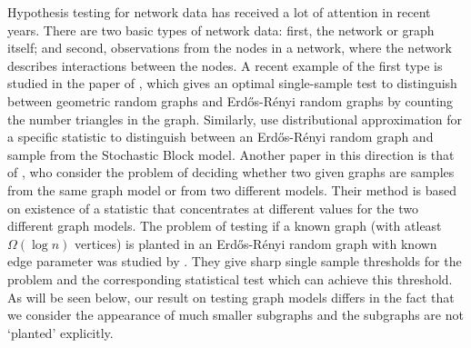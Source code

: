 \documentclass[final,12pt]{colt2018}
\begin{document}
Hypothesis testing for network data has received a lot of attention in  recent years. There are two basic types of network data: first, the network or graph itself; and second, observations from the nodes in a network, where the network describes interactions between the nodes.
A recent example of the first type is studied in the paper of \citet{bubeck2016testing}, which gives an optimal single-sample test to distinguish between geometric random graphs and Erd\H{o}s-R\'enyi random graphs by counting the number triangles in the graph. Similarly, \citet{gao2017testing} use distributional approximation for a specific statistic to distinguish between an Erd\H{o}s-R\'enyi random graph and sample from the Stochastic Block model. Another paper in this direction is that of \citet{ghoshdastidar2017two}, who consider the problem of deciding whether two given graphs are samples from the same graph model or from two different models. Their method is based on existence of a statistic that concentrates at different values for the two different graph models. The problem of testing if a known graph (with atleast $\Omega(\log{n})$ vertices) is planted in an Erd\H{o}s-R\'enyi random graph with known edge parameter was studied by \cite{javadi2015statistical}. They give sharp single sample thresholds for the problem and the corresponding statistical test which can achieve this threshold. As will be seen below, our result on testing graph models differs in the fact that we consider the appearance of much smaller subgraphs and the subgraphs are not `planted' explicitly. 
\end{document}
